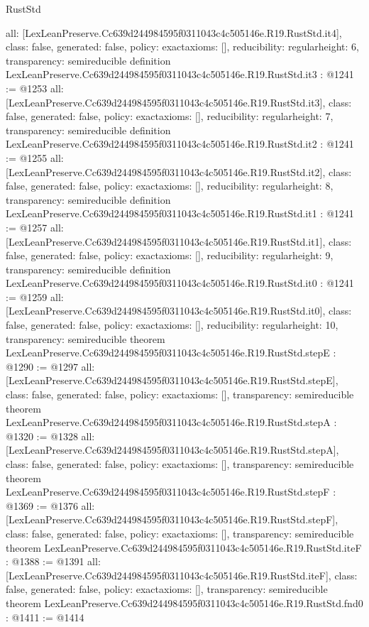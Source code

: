 \begin{lexlean}{RustStd}
\begin{coremodule}
{  all: [LexLeanPreserve.Cc639d244984595f0311043c4c505146e.R19.RustStd.it4],
  class: false,
  generated: false,
  policy: exact{axioms: []},
  reducibility: regular{height: 6},
  transparency: semireducible
}
definition LexLeanPreserve.Cc639d244984595f0311043c4c505146e.R19.RustStd.it3 : @1241 := @1253 {
  all: [LexLeanPreserve.Cc639d244984595f0311043c4c505146e.R19.RustStd.it3],
  class: false,
  generated: false,
  policy: exact{axioms: []},
  reducibility: regular{height: 7},
  transparency: semireducible
}
definition LexLeanPreserve.Cc639d244984595f0311043c4c505146e.R19.RustStd.it2 : @1241 := @1255 {
  all: [LexLeanPreserve.Cc639d244984595f0311043c4c505146e.R19.RustStd.it2],
  class: false,
  generated: false,
  policy: exact{axioms: []},
  reducibility: regular{height: 8},
  transparency: semireducible
}
definition LexLeanPreserve.Cc639d244984595f0311043c4c505146e.R19.RustStd.it1 : @1241 := @1257 {
  all: [LexLeanPreserve.Cc639d244984595f0311043c4c505146e.R19.RustStd.it1],
  class: false,
  generated: false,
  policy: exact{axioms: []},
  reducibility: regular{height: 9},
  transparency: semireducible
}
definition LexLeanPreserve.Cc639d244984595f0311043c4c505146e.R19.RustStd.it0 : @1241 := @1259 {
  all: [LexLeanPreserve.Cc639d244984595f0311043c4c505146e.R19.RustStd.it0],
  class: false,
  generated: false,
  policy: exact{axioms: []},
  reducibility: regular{height: 10},
  transparency: semireducible
}
theorem LexLeanPreserve.Cc639d244984595f0311043c4c505146e.R19.RustStd.stepE : @1290 := @1297 {
  all: [LexLeanPreserve.Cc639d244984595f0311043c4c505146e.R19.RustStd.stepE],
  class: false,
  generated: false,
  policy: exact{axioms: []},
  transparency: semireducible
}
theorem LexLeanPreserve.Cc639d244984595f0311043c4c505146e.R19.RustStd.stepA : @1320 := @1328 {
  all: [LexLeanPreserve.Cc639d244984595f0311043c4c505146e.R19.RustStd.stepA],
  class: false,
  generated: false,
  policy: exact{axioms: []},
  transparency: semireducible
}
theorem LexLeanPreserve.Cc639d244984595f0311043c4c505146e.R19.RustStd.stepF : @1369 := @1376 {
  all: [LexLeanPreserve.Cc639d244984595f0311043c4c505146e.R19.RustStd.stepF],
  class: false,
  generated: false,
  policy: exact{axioms: []},
  transparency: semireducible
}
theorem LexLeanPreserve.Cc639d244984595f0311043c4c505146e.R19.RustStd.iteF : @1388 := @1391 {
  all: [LexLeanPreserve.Cc639d244984595f0311043c4c505146e.R19.RustStd.iteF],
  class: false,
  generated: false,
  policy: exact{axioms: []},
  transparency: semireducible
}
theorem LexLeanPreserve.Cc639d244984595f0311043c4c505146e.R19.RustStd.fnd0 : @1411 := @1414 {
}
\end{coremodule}
\end{lexlean}
